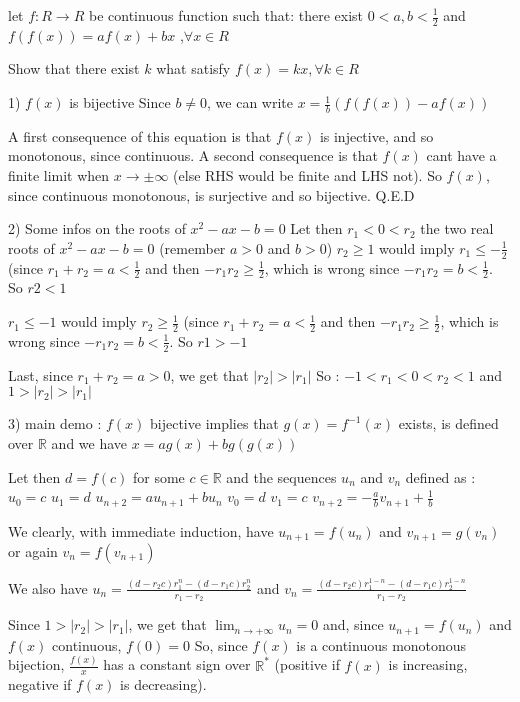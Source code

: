 \begin{solution}
	\begin{tcolorbox}let $ f: R \to R$ be continuous function such that: there exist $ 0 < a,b < \frac {1}{2}$ and 
$ f(f(x)) = af(x) + bx$ ,$ \forall x \in R$

Show that there exist $ k$ what satisfy $ f(x) = kx, \forall k \in R$\end{tcolorbox}

1) $ f(x)$ is bijective
Since $ b\neq 0$, we can write $ x = \frac 1b(f(f(x)) - af(x))$

A first consequence of this equation is that $ f(x)$ is injective, and so monotonous, since continuous.
A second consequence is that $ f(x)$ cant have a finite limit when $ x\to \pm\infty$ (else RHS would be finite and LHS not). So $ f(x)$, since continuous monotonous, is surjective and so bijective.
Q.E.D

2) Some infos on the roots of  $ x^2 - ax - b = 0$
Let then $ r_1 < 0 < r_2$ the two real roots of $ x^2 - ax - b = 0$ (remember $ a > 0$ and $ b > 0$)
$ r_2\geq 1$ would imply $ r_1\leq - \frac 12$ (since $ r_1 + r_2 = a < \frac 12$ and then $ - r_1r_2\geq \frac 12$, which is wrong since $ - r_1r_2 = b < \frac 12$. So $ r2 < 1$

$ r_1\leq - 1$ would imply $ r_2\geq\frac 12$ (since $ r_1 + r_2 = a < \frac 12$ and then $ - r_1r_2\geq \frac 12$, which is wrong since $ - r_1r_2 = b < \frac 12$. So $ r1 > - 1$

Last, since $ r_1 + r_2 = a > 0$, we get that $ |r_2| > |r_1|$
So : $ - 1 < r_1 < 0 < r_2 < 1$ and $ 1 > |r_2| > |r_1|$

3) main demo :
$ f(x)$ bijective implies that $ g(x) = f^{ - 1}(x)$ exists, is defined over $ \mathbb R$ and we have $ x = ag(x) + bg(g(x))$

Let then $ d = f(c)$ for some $ c\in\mathbb R$ and the sequences  $ u_n$ and $ v_n$ defined as :
$ u_0 = c$
$ u_1 = d$
$ u_{n + 2} = au_{n + 1} + bu_n$
$ v_0 = d$
$ v_1 = c$
$ v_{n + 2} = - \frac abv_{n + 1} + \frac 1b$

We clearly, with immediate induction, have $ u_{n + 1} = f(u_n)$ and $ v_{n + 1} = g(v_n)$ or again $ v_n = f(v_{n + 1})$

We also have $ u_n = \frac {(d - r_2c)r_1^n - (d - r_1c)r_2^n}{r_1 - r_2}$ and $ v_n = \frac {(d - r_2c)r_1^{1 - n} - (d - r_1c)r_2^{1 - n}}{r_1 - r_2}$

Since $ 1 > |r_2| > |r_1|$, we get that $ \lim_{n\to + \infty}u_n = 0$ and, since $ u_{n + 1} = f(u_n)$ and $ f(x)$ continuous, $ f(0) = 0$
So, since $ f(x)$ is a continuous monotonous bijection, $ \frac {f(x)}x$ has a constant sign over $ \mathbb R^*$ (positive if $ f(x)$ is increasing, negative if $ f(x)$ is decreasing).


\end{solution}
